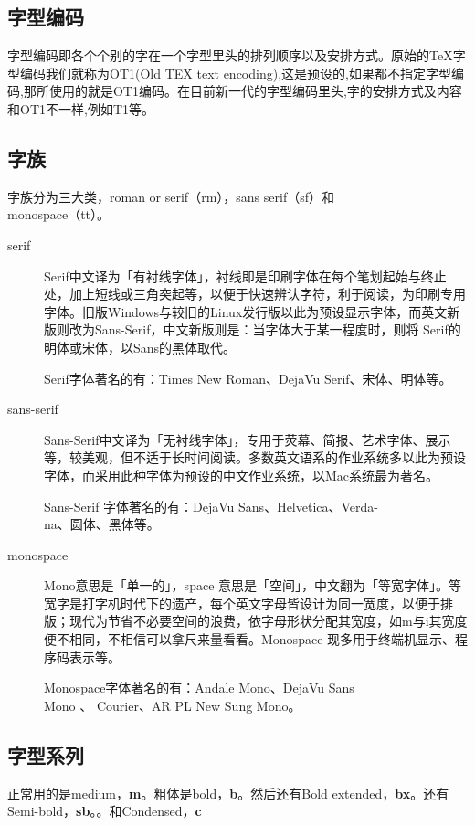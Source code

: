 \documentclass[11pt,oneside]{book}
\begin{document}
  \subsection{字型编码}
  字型编码即各个个别的字在一个字型里头的排列顺序以及安排方式。原始的\TeX 字型编码我们就称为OT1(Old TEX text encoding),这是预设的,如果都不指定字型编码,那所使用的就是OT1编码。在目前新一代的字型编码里头,字的安排方式及内容和OT1不一样,例如T1等。


  \subsection{字族}
  字族分为三大类，roman or serif（rm），sans serif（sf）和\\monospace（tt）。


  \begin{description}
  \item[serif] Serif中文译为「有衬线字体」，衬线即是印刷字体在每个笔划起始与终止处，加上短线或三角突起等，以便于快速辨认字符，利于阅读，为印刷专用字体。旧版Windows与较旧的Linux发行版以此为预设显示字体，而英文新版则改为Sans-Serif，中文新版则是：当字体大于某一程度时，则将 Serif的明体或宋体，以Sans的黑体取代。

    Serif字体著名的有：Times New Roman、DejaVu Serif、宋体、明体等。

  \item[sans-serif] Sans-Serif中文译为「无衬线字体」，专用于荧幕、简报、艺术字体、展示等，较美观，但不适于长时间阅读。多数英文语系的作业系统多以此为预设字体，而采用此种字体为预设的中文作业系统，以Mac系统最为著名。

    Sans-Serif 字体著名的有：DejaVu Sans、Helvetica、Verda-\\na、圆体、黑体等。

  \item[monospace] Mono意思是「单一的」，space 意思是「空间」，中文翻为「等宽字体」。等宽字是打字机时代下的遗产，每个英文字母皆设计为同一宽度，以便于排版；现代为节省不必要空间的浪费，依字母形状分配其宽度，如m与i其宽度便不相同，不相信可以拿尺来量看看。Monospace 现多用于终端机显示、程序码表示等。

    Monospace字体著名的有：Andale Mono、DejaVu Sans \\ Mono 、 Courier、AR PL New Sung Mono。
  \end{description}


  \subsection{字型系列}
  正常用的是medium，\textbf{m}。粗体是bold，\textbf{b}。然后还有Bold extended，\textbf{bx}。还有Semi-bold，\textbf{sb}。。和Condensed，\textbf{c}
\end{document}
